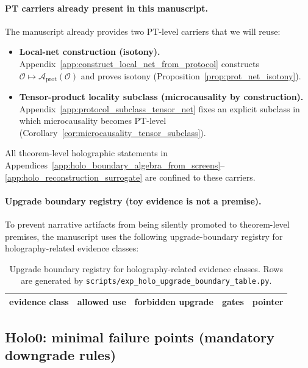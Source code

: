\paragraph{PT carriers already present in this manuscript.}
\AuditTag The manuscript already provides two PT-level carriers that we will reuse:
\begin{itemize}
\item \textbf{Local-net construction (isotony).} Appendix~\ref{app:construct_local_net_from_protocol}
constructs $\mathcal{O}\mapsto\mathcal{A}_{\mathrm{prot}}(\mathcal{O})$ and proves isotony
(Proposition~\ref{prop:prot_net_isotony}).
\item \textbf{Tensor-product locality subclass (microcausality by construction).}
Appendix~\ref{app:protocol_subclass_tensor_net} fixes an explicit subclass in which
microcausality becomes PT-level (Corollary~\ref{cor:microcausality_tensor_subclass}).
\end{itemize}
All theorem-level holographic statements in Appendices~\ref{app:holo_boundary_algebra_from_screens}--\ref{app:holo_reconstruction_surrogate}
are confined to these carriers.

\paragraph{Upgrade boundary registry (toy evidence is not a premise).}
\AuditTag To prevent narrative artifacts from being silently promoted to theorem-level premises, the manuscript uses the following
upgrade-boundary registry for holography-related evidence classes:
\begin{table}[H]
\centering
\scriptsize
\setlength{\tabcolsep}{6pt}
\renewcommand{\arraystretch}{1.15}
\begin{tabular}{p{} p{} p{} p{} p{}}
\toprule
evidence class & allowed use & forbidden upgrade & gates & pointer \\
\midrule
%
\end{tabular}
\caption{Upgrade boundary registry for holography-related evidence classes. Rows are generated by \texttt{scripts/exp\_holo\_upgrade\_boundary\_table.py}.}
\label{tab:holo_upgrade_boundary_registry}
\end{table}
%

\subsection{Holo0: minimal failure points (mandatory downgrade rules)}
\label{subsec:holo0_failure_points}


